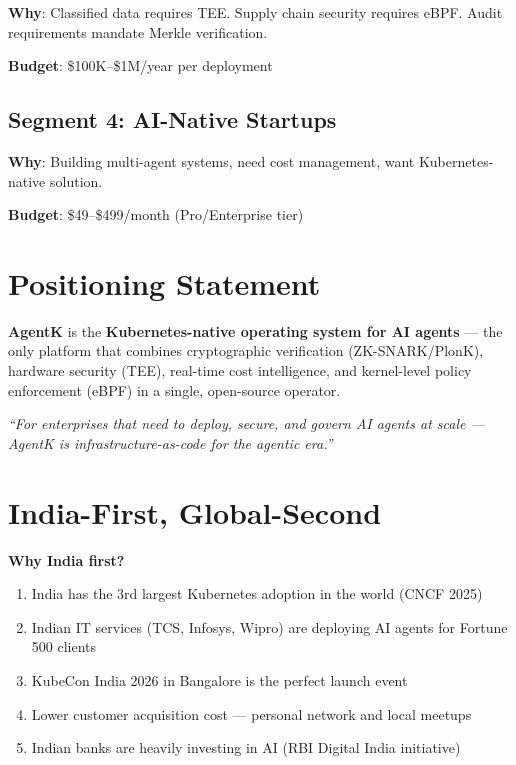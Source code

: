\documentclass[12pt,a4paper,openany]{report}
\begin{document}
\textbf{Why}: Classified data requires TEE. Supply chain security requires eBPF. Audit requirements mandate Merkle verification.

\textbf{Budget}: \$100K--\$1M/year per deployment

\subsection{Segment 4: AI-Native Startups}

\textbf{Why}: Building multi-agent systems, need cost management, want Kubernetes-native solution.

\textbf{Budget}: \$49--\$499/month (Pro/Enterprise tier)

\section{Positioning Statement}

\begin{tcolorbox}[colback=agentk-light, colframe=agentk-blue, fonttitle=\bfseries, title=Positioning]
\textbf{AgentK} is the \textbf{Kubernetes-native operating system for AI agents} — the only platform that combines cryptographic verification (ZK-SNARK/PlonK), hardware security (TEE), real-time cost intelligence, and kernel-level policy enforcement (eBPF) in a single, open-source operator.

\textit{``For enterprises that need to deploy, secure, and govern AI agents at scale — AgentK is infrastructure-as-code for the agentic era.''}
\end{tcolorbox}

\section{India-First, Global-Second}

\begin{moneybox}
\textbf{Why India first?}
\begin{enumerate}
    \item India has the 3rd largest Kubernetes adoption in the world (CNCF 2025)
    \item Indian IT services (TCS, Infosys, Wipro) are deploying AI agents for Fortune 500 clients
    \item KubeCon India 2026 in Bangalore is the perfect launch event
    \item Lower customer acquisition cost — personal network and local meetups
    \item Indian banks are heavily investing in AI (RBI Digital India initiative)
\end{enumerate}
\end{moneybox}
\end{document}

